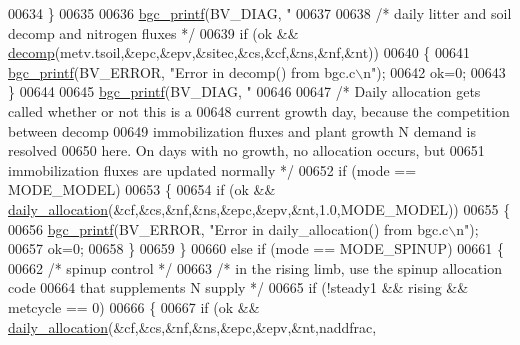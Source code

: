 \begin{DoxyCode}
{{{{{{{{{{{{{{{{{00634             \}
00635             
00636             \hyperlink{bgc__io_8c_af287cce6e2aede1ce337de9319e80d0d}{bgc\_printf}(BV\_DIAG, \textcolor{stringliteral}{"%
00637 
00638             \textcolor{comment}{/* daily litter and soil decomp and nitrogen fluxes */}
00639             \textcolor{keywordflow}{if} (ok && \hyperlink{decomp_8c_a5ce50023ade7c1dfcca146c06f3ba9da}{decomp}(metv.tsoil,&epc,&epv,&sitec,&cs,&cf,&ns,&nf,&nt))
00640             \{
00641                 \hyperlink{bgc__io_8c_af287cce6e2aede1ce337de9319e80d0d}{bgc\_printf}(BV\_ERROR, \textcolor{stringliteral}{"Error in decomp() from bgc.c\(\backslash\)n"});
00642                 ok=0;
00643             \}
00644             
00645             \hyperlink{bgc__io_8c_af287cce6e2aede1ce337de9319e80d0d}{bgc\_printf}(BV\_DIAG, \textcolor{stringliteral}{"%
00646 
00647             \textcolor{comment}{/* Daily allocation gets called whether or not this is a}
00648 \textcolor{comment}{            current growth day, because the competition between decomp}
00649 \textcolor{comment}{            immobilization fluxes and plant growth N demand is resolved}
00650 \textcolor{comment}{            here.  On days with no growth, no allocation occurs, but}
00651 \textcolor{comment}{            immobilization fluxes are updated normally */}
00652             \textcolor{keywordflow}{if} (mode == MODE\_MODEL)
00653             \{
00654                 \textcolor{keywordflow}{if} (ok && \hyperlink{daily__allocation_8c_a78494a491616be3574480363952f005f}{daily\_allocation}(&cf,&cs,&nf,&ns,&epc,&epv,&nt,1.0,MODE\_MODEL))
00655                 \{
00656                     \hyperlink{bgc__io_8c_af287cce6e2aede1ce337de9319e80d0d}{bgc\_printf}(BV\_ERROR, \textcolor{stringliteral}{"Error in daily\_allocation() from bgc.c\(\backslash\)n"});
00657                     ok=0;
00658                 \}
00659             \}
00660             \textcolor{keywordflow}{else} \textcolor{keywordflow}{if} (mode == MODE\_SPINUP)
00661             \{
00662                 \textcolor{comment}{/* spinup control */}
00663                 \textcolor{comment}{/* in the rising limb, use the spinup allocation code}
00664 \textcolor{comment}{                that supplements N supply */}
00665                 \textcolor{keywordflow}{if} (!steady1 && rising && metcycle == 0)
00666                 \{
00667                     \textcolor{keywordflow}{if} (ok && \hyperlink{daily__allocation_8c_a78494a491616be3574480363952f005f}{daily\_allocation}(&cf,&cs,&nf,&ns,&epc,&epv,&nt,naddfrac,
}}}}}}}}}}}}}}}}}}}
\end{DoxyCode}
